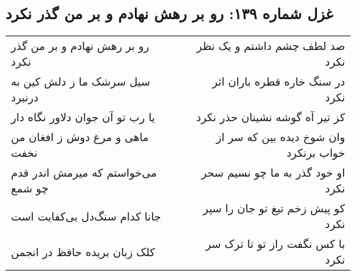 \begin{center}
\section*{غزل شماره ۱۳۹: رو بر رهش نهادم و بر من گذر نکرد}
\label{sec:sh139}
\begin{longtable}{l p{0.5cm} r}
رو بر رهش نهادم و بر من گذر نکرد
&&
صد لطف چشم داشتم و یک نظر نکرد
\\
سیل سرشک ما ز دلش کین به درنبرد
&&
در سنگ خاره قطره باران اثر نکرد
\\
یا رب تو آن جوان دلاور نگاه دار
&&
کز تیر آه گوشه نشینان حذر نکرد
\\
ماهی و مرغ دوش ز افغان من نخفت
&&
وان شوخ دیده بین که سر از خواب برنکرد
\\
می‌خواستم که میرمش اندر قدم چو شمع
&&
او خود گذر به ما چو نسیم سحر نکرد
\\
جانا کدام سنگ‌دل بی‌کفایت است
&&
کو پیش زخم تیغ تو جان را سپر نکرد
\\
کلک زبان بریده حافظ در انجمن
&&
با کس نگفت راز تو تا ترک سر نکرد
\\
\end{longtable}
\end{center}

